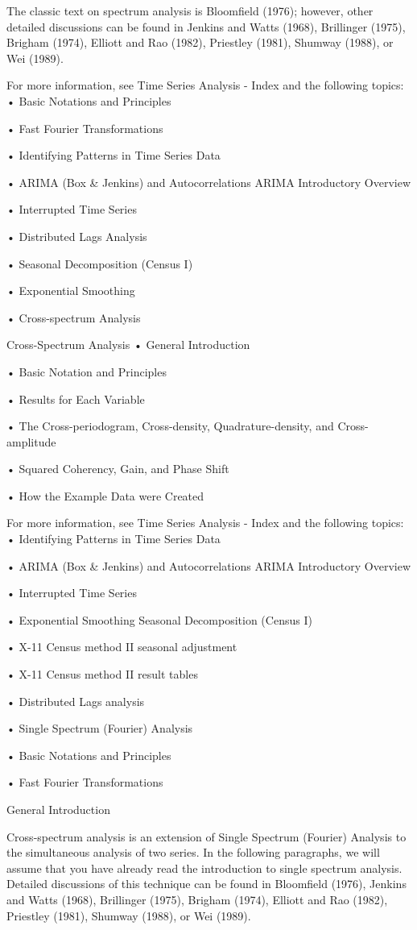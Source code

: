 The classic text on spectrum analysis is Bloomfield (1976); however, other detailed discussions can be found in Jenkins and Watts (1968), Brillinger (1975), Brigham (1974), Elliott and Rao (1982), Priestley (1981), Shumway (1988), or Wei (1989).

For more information, see Time Series Analysis - Index and the following topics:
•
Basic Notations and Principles

•
Fast Fourier Transformations

•
Identifying Patterns in Time Series Data

•
ARIMA (Box & Jenkins) and Autocorrelations ARIMA Introductory Overview

•
Interrupted Time Series

•
Distributed Lags Analysis

•
Seasonal Decomposition (Census I)

•
Exponential Smoothing

•
Cross-spectrum Analysis


Cross-Spectrum Analysis
•
General Introduction

•
Basic Notation and Principles

•
Results for Each Variable

•
The Cross-periodogram, Cross-density, Quadrature-density, and Cross-amplitude

•
Squared Coherency, Gain, and Phase Shift

•
How the Example Data were Created


For more information, see Time Series Analysis - Index and the following topics:
•
Identifying Patterns in Time Series Data

•
ARIMA (Box & Jenkins) and Autocorrelations ARIMA Introductory Overview

•
Interrupted Time Series

•
Exponential Smoothing Seasonal Decomposition (Census I)

•
X-11 Census method II seasonal adjustment

•
X-11 Census method II result tables

•
Distributed Lags analysis

•
Single Spectrum (Fourier) Analysis

•
Basic Notations and Principles

•
Fast Fourier Transformations



General Introduction

Cross-spectrum analysis is an extension of Single Spectrum (Fourier) Analysis to the simultaneous analysis of two series. In the following paragraphs, we will assume that you have already read the introduction to single spectrum analysis. Detailed discussions of this technique can be found in Bloomfield (1976), Jenkins and Watts (1968), Brillinger (1975), Brigham (1974), Elliott and Rao (1982), Priestley (1981), Shumway (1988), or Wei (1989).

